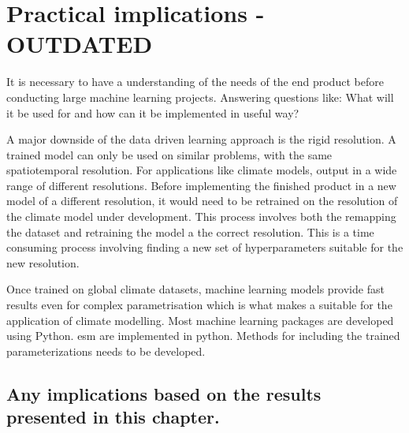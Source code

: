 \section{Practical implications - OUTDATED} \label{sec:practical_implications}
It is necessary to have a understanding of the needs of the end product before conducting large machine learning projects. Answering questions like: What will it be used for and how can it be implemented in useful way?

A major downside of the data driven learning approach is the rigid resolution. A trained model can only be used on similar problems, with the same spatiotemporal resolution. For applications like climate models, output in a wide range of different resolutions. Before implementing the finished product in a new model of a different resolution, it would need to be retrained on the resolution of the climate model under development. This process involves both the remapping the dataset and retraining the model a the correct resolution. This is a time consuming process involving finding a new set of hyperparameters suitable for the new resolution. %

Once trained on global climate datasets, machine learning models provide fast results even for complex parametrisation which is what makes a suitable for the application of climate modelling. Most machine learning packages are developed using Python. \acrfull{esm} are implemented in python. Methods for including the trained parameterizations needs to be developed.
 
\subsection{Any implications based on the results presented in this chapter.}